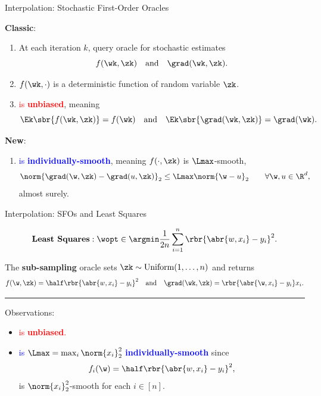 \documentclass[mathserif,notheorems, hyperref={colorlinks, urlcolor=blue, linkcolor=blue}]{beamer}
\begin{document}
    \begin{frame}{Interpolation: Stochastic First-Order Oracles}

        \textbf{Classic}:
        \begin{enumerate}
            \item At each iteration \( k \), query oracle \oracle{} for stochastic estimates 
                \[ f(\wk, \zk) \quad \text{and} \quad \grad(\wk, \zk). \] 
            \item \( f(\wk, \cdot) \) is a deterministic function of random variable \( \zk \). 
                \vspace{1ex}
            \item \textcolor{red}{\oracle{} is \textbf{unbiased}}, meaning 
            \[ \Ek\sbr{f(\wk, \zk)} = f(\wk) \quad \text{and} \quad \Ek\sbr{\grad(\wk, \zk)} = \grad(\wk). \]%
        \end{enumerate}%
        \pause%
        \textbf{New}:
        \begin{enumerate}
            \item \textcolor{blue}{\oracle{} is \textbf{individually-smooth}}, meaning \( f(\cdot, \zk) \) is \( \Lmax \)-smooth, 
                \begin{align*}
                    \norm{\grad(\w, \zk) - \grad(u, \zk)}_2 &\leq \Lmax \norm{\w - u}_2 \tag*{\(\forall \w, u \in \R^d \),} 
                \end{align*}
                almost surely.
        \end{enumerate}

    \end{frame}

    \begin{frame}{Interpolation: SFOs and Least Squares}
        \vspace{-1ex}

        \[ \textbf{Least Squares}: \wopt \in \argmin \frac{1}{2n} \sum_{i=1}^n \rbr{\abr{w, x_i} - y_i}^2. \]
        
        \vspace{2ex} 
        
        The \textbf{sub-sampling} oracle sets \( \zk \sim \text{Uniform}(1, \ldots, n) \) and returns 
        \[ f(\w, \zk) =  \half \rbr{\abr{w, x_i} - y_i}^2 \quad \text{and} \quad \grad(\wk, \zk) = \rbr{\abr{\w, x_i} - y_i} x_i. \]

        \pause 
        \rule{\textwidth}{0.4pt}
        Observations: 
        \begin{itemize}
            \item \textcolor{red}{\oracle{} is \textbf{unbiased}.} 
            \item \textcolor{blue}{\oracle{} is \( \Lmax = \max_{i} \norm{x_i}^2_2 \) \textbf{individually-smooth}} since 
                    \[ f_{i}(\w) = \half \rbr{\abr{w, x_{i}} - y_{i}}^2, \]
                    is \( \norm{x_{i}}_2^2 \)-smooth for each \( i \in [n] \).
        \end{itemize}

    \end{frame}
\end{document}

